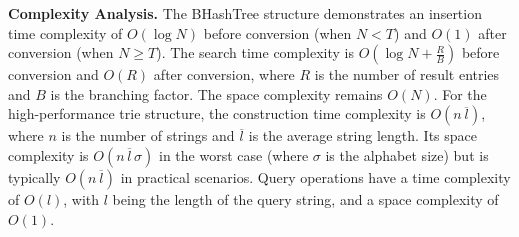 \noindent \textbf{Complexity Analysis.} 
The BHashTree structure demonstrates an insertion time complexity of \( O(\log N) \) before conversion (when \( N < T \)) and \( O(1) \) after conversion (when \( N \geq T \)). 
The search time complexity is \( O(\log N + \frac{R}{B} ) \) before conversion and \( O(R) \) after conversion, where \( R \) is the number of result entries and \( B \) is the branching factor. The space complexity remains \( O(N) \). 
For the high-performance trie structure, the construction time complexity is \( O(n \, \overline{l}) \), where \( n \) is the number of strings and \( \overline{l} \) is the average string length. 
Its space complexity is \( O(n \, \overline{l} \, \sigma) \) in the worst case (where \( \sigma \) is the alphabet size) but is typically \( O(n \, \overline{l}) \) in practical scenarios.
Query operations have a time complexity of \( O(l) \), with \( l \) being the length of the query string, and a space complexity of \( O(1) \).